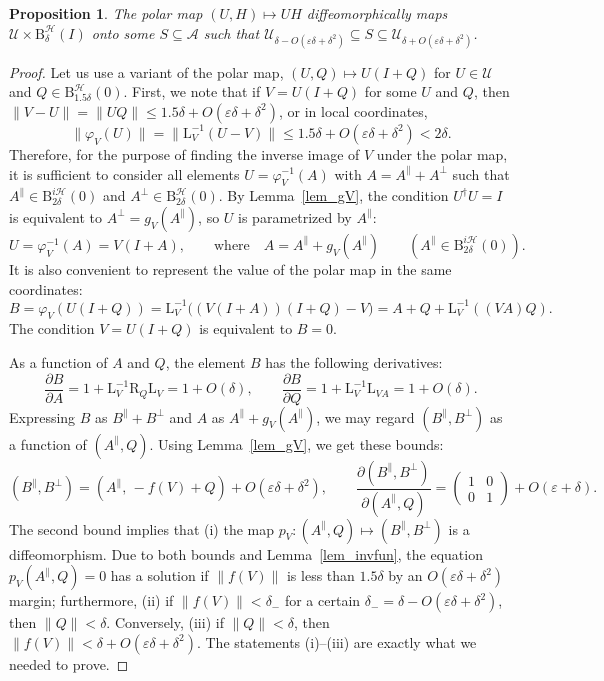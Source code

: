 \documentclass[12pt]{article}
\newcommand{\calA}{\mathcal{A}}
\newcommand{\calH}{\mathcal{H}}
\newcommand{\calU}{\mathcal{U}}
\newcommand{\Ba}{\mathrm{B}}
\newcommand{\La}{\mathrm{L}}
\newcommand{\Ra}{\mathrm{R}}
\newcommand{\eps}{\varepsilon}
\newcommand{\ph}{\varphi}
\renewcommand{\le}{\leqslant}
\newtheorem{Proposition}[Theorem]{Proposition}
\newtheorem[definition]{Definition}[Theorem]{Definition}
\newtheorem[remark]{Example}[Theorem]{Example}
\newtheorem[remark]{Remark}[Theorem]{Remark}
\newtheorem[remark]{Question}[Theorem]{Open question}
\newtheorem*[definition]{definition}{Definition}
\newtheorem*[remark]{example}{Example}
\newtheorem*[remark]{remark}{Remark}
\newtheorem*[remark]{question}{Open question}
\numberwithin{equation}{section}
\begin{document}
\begin{Proposition}\label{prop_polar}
The polar map $(U,H)\mapsto UH$ diffeomorphically maps $\calU\times\Ba^\calH_{\delta}(I)$ onto some $S\subseteq\calA$ such that $\calU_{\delta-O(\eps\delta+\delta^2)}\subseteq S\subseteq \calU_{\delta+O(\eps\delta+\delta^2)}$.
\end{Proposition}

\begin{proof}
Let us use a variant of the polar map, $(U,Q)\mapsto U(I+Q)$ for $U\in\calU$ and $Q\in\Ba^\calH_{1.5\delta}(0)$. First, we note that if $V=U(I+Q)$ for some $U$ and $Q$, then $\|V-U\|=\|UQ\|\le 1.5\delta+O(\eps\delta+\delta^2)$, or in local coordinates,
\[
\|\ph_V(U)\|=\|\La_V^{-1}(U-V)\|\le 1.5\delta+O(\eps\delta+\delta^2)<2\delta.
\]
Therefore, for the purpose of finding the inverse image of $V$ under the polar map, it is sufficient to consider all elements $U=\ph_V^{-1}(A)$ with $A=A^\parallel+A^\perp$ such that $A^\parallel\in\Ba^{i\calH}_{2\delta}(0)$ and $A^\perp\in\Ba^\calH_{2\delta}(0)$. By Lemma~\ref{lem_gV}, the condition $U^\dag U=I$ is equivalent to $A^\perp=g_V(A^\parallel)$, so $U$ is parametrized by $A^\parallel$:
\[
U=\ph_V^{-1}(A)=V(I+A),\qquad
\text{where}\quad A=A^\parallel+g_V(A^\parallel)\qquad
(A^\parallel\in\Ba^{i\calH}_{2\delta}(0)).
\]
It is also convenient to represent the value of the polar map in the same coordinates:
\[
B =\ph_V(U(I+Q))=\La_V^{-1}\bigl((V(I+A))(I+Q)-V\bigr)
= A+Q+\La_V^{-1}((VA)Q).
\]
The condition $V=U(I+Q)$ is equivalent to $B=0$.

As a function of $A$ and $Q$, the element $B$ has the following derivatives:
\[
\frac{\partial B}{\partial A}=1+\La_V^{-1}\Ra_Q\La_V=1+O(\delta),\qquad
\frac{\partial B}{\partial Q}=1+\La_V^{-1}\La_{VA}=1+O(\delta).
\]
Expressing $B$ as $B^\parallel+B^\perp$ and $A$ as $A^\parallel+g_V(A^\parallel)$, we may regard $(B^\parallel,B^\perp)$ as a function of $(A^\parallel,Q)$. Using Lemma~\ref{lem_gV}, we get these bounds:
\begin{equation}\label{der_B_AQ}
(B^\parallel,B^\perp)=(A^\parallel,\,-f(V)+Q)+O(\eps\delta+\delta^2),\qquad
\frac{\partial(B^\parallel,B^\perp)}{\partial(A^\parallel,Q)}
=\begin{pmatrix}1&0\\ 0&1\end{pmatrix}+O(\eps+\delta).
\end{equation}
The second bound implies that (i) the map $p_V\colon (A^\parallel,Q)\mapsto(B^\parallel,B^\perp)$ is a diffeomorphism. Due to both bounds and Lemma~\ref{lem_invfun}, the equation $p_V(A^\parallel,Q)=0$ has a solution if $\|f(V)\|$ is less than $1.5\delta$ by an $O(\eps\delta+\delta^2)$ margin; furthermore, (ii) if $\|f(V)\|<\delta_-$ for a certain $\delta_-=\delta-O(\eps\delta+\delta^2)$, then $\|Q\|<\delta$. Conversely, (iii) if $\|Q\|<\delta$, then $\|f(V)\|<\delta+O(\eps\delta+\delta^2)$. The statements (i)--(iii) are exactly what we needed to prove.
\end{proof}
\end{document}
